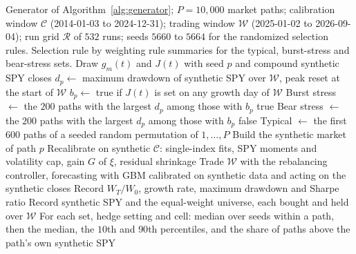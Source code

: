 \begin{algorithm}[t]
\caption{Evaluation of the method on synthetic futures.}
\label{alg:evaluation}
\small
\begin{algorithmic}[1]
  \REQUIRE Generator of Algorithm~\ref{alg:generator}; $P = 10{,}000$ market paths; calibration window
    $\mathcal{C}$ (2014-01-03 to 2024-12-31); trading window $\mathcal{W}$ (2025-01-02 to 2026-09-04); run grid
    $\mathcal{R}$ of $532$ runs; seeds $5660$ to $5664$ for the randomized selection rules.
  \ENSURE Selection rule by weighting rule summaries for the typical, burst-stress and bear-stress sets.
    \STATE Draw $g_m(t)$ and $J(t)$ with seed $p$ and compound synthetic SPY closes
    \STATE $d_p \gets$ maximum drawdown of synthetic SPY over $\mathcal{W}$, peak reset at the start of
      $\mathcal{W}$
    \STATE $b_p \gets$ true if $J(t)$ is set on any growth day of $\mathcal{W}$
  \ENDFOR
  \STATE Burst stress $\gets$ the $200$ paths with the largest $d_p$ among those with $b_p$ true
  \STATE Bear stress $\gets$ the $200$ paths with the largest $d_p$ among those with $b_p$ false
  \STATE Typical $\gets$ the first $600$ paths of a seeded random permutation of $1, \dots, P$
    \STATE Build the synthetic market of path $p$
      \hfill {}
    \STATE Recalibrate on synthetic $\mathcal{C}$: single-index fits, SPY moments and volatility cap, gain $G$ of
      $\xi$, residual shrinkage
      \STATE Trade $\mathcal{W}$ with the rebalancing controller, forecasting with GBM calibrated on synthetic
        data and acting on the synthetic closes
      \STATE Record $W_T/W_0$, growth rate, maximum drawdown and Sharpe ratio
    \ENDFOR
    \STATE Record synthetic SPY and the equal-weight universe, each bought and held over $\mathcal{W}$
  \ENDFOR
  \STATE For each set, hedge setting and cell: median over seeds within a path, then the median, the $10$th and
    $90$th percentiles, and the share of paths above the path's own synthetic SPY
\end{algorithmic}
\end{algorithm}

